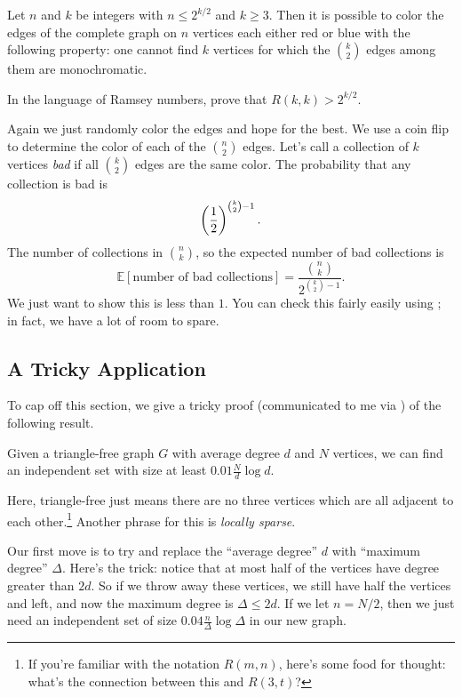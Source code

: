 \documentclass[11pt]{scrartcl}
\newcommand\EE{\mathbb E}
\begin{document}
\begin{example}
   Let $n$ and $k$ be integers with $n \le 2^{k/2}$ and $k \ge 3$.
  Then it is possible to color the edges of the complete graph on $n$ vertices
  each either red or blue with the following property:
  one cannot find $k$ vertices for which the $\binom k2$ edges among them
  are monochromatic.
\end{example}
\begin{remark*}
  In the language of Ramsey numbers, prove that $R(k,k) > 2^{k/2}$.
\end{remark*}
\begin{soln}
  Again we just randomly color the edges and hope for the best.
  We use a coin flip to determine the color of each of the $\binom n2$ edges.
  Let's call a collection of $k$ vertices \emph{bad} if all $\binom k2$ edges are the same color.
  The probability that any collection is bad is
  \[ \left( \frac{1}{2} \right)^{\binom k2 - 1}. \]
  The number of collections in $\binom nk$, so the expected number of bad collections is
  \[ \EE[\text{number of bad collections}] = \frac{\binom nk}{2^{\binom k2 - 1}}. \]
  We just want to show this is less than $1$.
  You can check this fairly easily using ; in fact, we have a lot of room to spare.
\end{soln}

\subsection{A Tricky Application}
To cap off this section, we give a tricky proof (communicated to me via \cite{potalk})
of the following result.

\begin{theorem}
  Given a triangle-free graph $G$ with average degree $d$ and $N$ vertices,
  we can find an independent set with size at least $0.01 \frac{N}{d} \log d$.
\end{theorem}

Here, triangle-free just means there are no three vertices which are all
adjacent to each other.\footnote{If you're familiar with the notation $R(m,n)$, here's some food for thought:
what's the connection between this and $R(3,t)$?}
Another phrase for this is \emph{locally sparse}.

Our first move is to try and replace the ``average degree'' $d$ with ``maximum degree'' $\Delta$.
Here's the trick: notice that at most half of the vertices have degree greater than $2d$.
So if we throw away these vertices, we still have half the vertices and left, and now the maximum
degree is $\Delta \le 2d$.
If we let $n = N/2$, then we just need an independent set of size $0.04 \frac{n}{\Delta} \log \Delta$
in our new graph.
\end{document}
